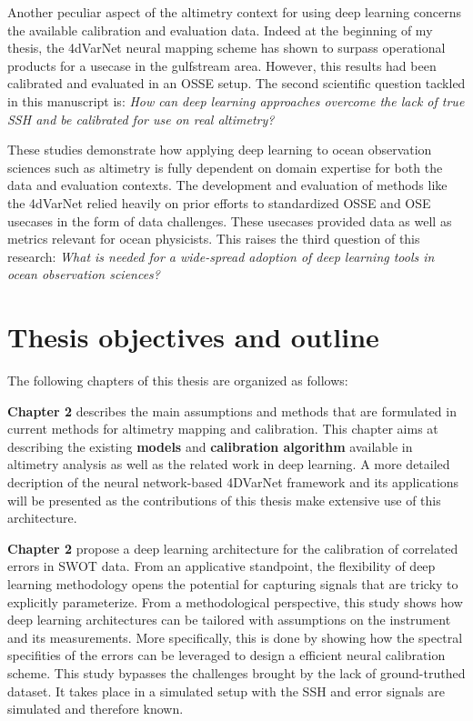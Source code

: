 \begin{bibunit}
Another peculiar aspect of the altimetry context for using deep learning concerns the available calibration and evaluation data.
Indeed at the beginning of my thesis, the 4dVarNet neural mapping scheme has shown to surpass operational products for a usecase in the gulfstream area\cite{fabletENDTOENDPHYSICSINFORMEDREPRESENTATION2021}. However, this results had been calibrated and evaluated in an OSSE setup. 
The second scientific question tackled in this manuscript is: \textit{How can deep learning approaches overcome the lack of true SSH and be calibrated for use on real altimetry?}


These studies demonstrate how applying deep learning to ocean observation sciences such as altimetry is fully dependent on domain expertise for both the data and evaluation contexts.
The development and evaluation of methods like the 4dVarNet relied heavily on prior efforts to standardized OSSE and OSE usecases in the form of data challenges\cite{ballarottaOceandatachallenges2020a_SSH_mapping_NATL60Material2020,ballarottaOceandatachallenges2021a_SSH_mapping_OSEMaterial2021}. These usecases provided data as well as metrics relevant for ocean physicists. 
This raises the third question of this research: \textit{What is needed for a wide-spread adoption of deep learning tools  in ocean observation sciences?}




\section{Thesis objectives and outline}

The following chapters of this thesis are organized as follows:

\textbf{Chapter 2} describes the main assumptions and methods that are formulated in current methods for altimetry mapping and calibration. This chapter aims at describing the existing \textbf{models} and \textbf{calibration algorithm} available in altimetry analysis as well as the related work in deep learning. A more detailed decription of the neural network-based 4DVarNet framework and its applications will be presented as the contributions of this thesis make extensive use of this architecture.

\textbf{Chapter 2} propose a deep learning architecture for the calibration of correlated errors in SWOT data.
From an applicative standpoint, the flexibility of deep learning methodology opens the potential for capturing signals that are tricky to explicitly parameterize.
From a methodological perspective, this study shows how deep learning architectures can be tailored with assumptions on the instrument and its measurements.
More specifically, this is done by showing how the spectral specifities of the errors can be leveraged to design a efficient neural calibration scheme.
This study bypasses the challenges brought by the lack of ground-truthed dataset.
It takes place in a simulated setup with the SSH and error signals are simulated and therefore known.



\end{bibunit}
